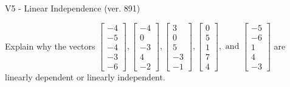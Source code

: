 \begin{exercise}
  \begin{exerciseTitle}V5 - Linear Independence (ver. 891)\end{exerciseTitle}
  \begin{exerciseStatement}
    Explain why the vectors \(\left[\begin{array}{r}
-4 \\
-5 \\
-4 \\
-3 \\
-6
\end{array}\right] , \left[\begin{array}{r}
-4 \\
0 \\
-3 \\
4 \\
-2
\end{array}\right] , \left[\begin{array}{r}
3 \\
0 \\
5 \\
-3 \\
-1
\end{array}\right] , \left[\begin{array}{r}
0 \\
5 \\
1 \\
7 \\
4
\end{array}\right] , \text{ and } \left[\begin{array}{r}
-5 \\
-6 \\
1 \\
4 \\
-3
\end{array}\right]\) are linearly dependent or linearly independent.	



\end{exerciseStatement}
\end{exercise}

